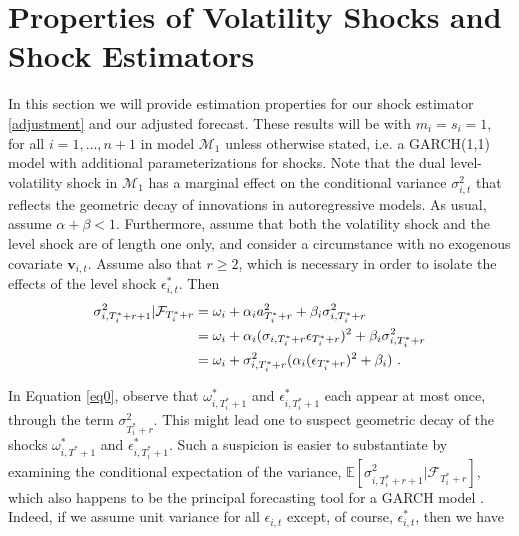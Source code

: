 \documentclass[11pt,3p,review,authoryear]{elsarticle}
\newcommand{\x}{\textbf{v}}
\def\mc#1{\mathcal{#1}} %
\def\mc#1{\mathcal{#1}}
\theoremstyle{definition}
\begin{document}
\section{Properties of Volatility Shocks and Shock Estimators}\label{SVF_properties}

In this section we will provide estimation properties for our shock  estimator \eqref{adjustment} and our adjusted forecast. These results will be with $m_i = s_i = 1$, for all $i = 1,\ldots,n+1$ in model $\mc{M}_1$ unless otherwise stated, i.e. a GARCH(1,1) model with additional parameterizations for shocks. Note that the dual level-volatility shock in $\mc{M}_1$ has a marginal effect on the conditional variance $\sigma^{2}_{i,t}$ that reflects the geometric decay of innovations in autoregressive models.  As usual, assume $\alpha+\beta < 1$.  Furthermore, assume that both the volatility shock and the level shock are of length one only, and consider a circumstance with no exogenous covariate $\x_{i,t}$. Assume also that $r\geq 2$, which is necessary in order to isolate the effects of the level shock $\epsilon^{*}_{i,t}$.  Then
\begin{align}
\sigma^{2}_{i,T_{i}^{*}+r+1} | \mathcal{F}_{T_{i}^{*}+r} & = \omega_{i} + \alpha_{i} a_{T_{i}^{*}+r}^{2} + \beta_{i}\sigma^{2}_{i,T_{i}^{*}+r} \label{eq0}\\
& = \omega_{i} + \alpha_{i}(\sigma_{i,T_{i}^{*}+r}\epsilon_{T_{i}^{*}+r})^{2} + \beta_{i}\sigma^{2}_{i,T_{i}^{*}+r}\notag \\
& = \omega_{i} + \sigma^{2}_{i,T_{i}^{*}+r}(\alpha_{i} (\epsilon_{T_{i}^{*}+r})^{2} + \beta_{i}) \text{ .}\notag 
\end{align}

In Equation \eqref{eq0}, observe that $\omega_{i,T_{i}^{*}+1}^{*}$ and $\epsilon^{*}_{i,T_{i}^{*}+1}$ 
each appear at most once, through the term $\sigma^{2}_{T_{i}^{*}+r}$.  This might lead one to 
suspect  geometric decay of the shocks $\omega_{i,T^{*}+1}^{*}$ and $\epsilon^{*}_{i,T_{i}^{*}+1}$.  
Such a suspicion is easier to substantiate by examining the conditional expectation of the variance, 
$\mathbb{E}[ \sigma^{2}_{i,T_{i}^{*}+r+1} |\mathcal{F}_{T_{i}^{*}+r}]$, which also happens to be the principal forecasting tool for a GARCH model \citep{zivot2009practical}.  Indeed, if we assume unit variance for all $\epsilon_{i,t}$ except, of course, $\epsilon^{*}_{i,t}$, then we have
\end{document}
